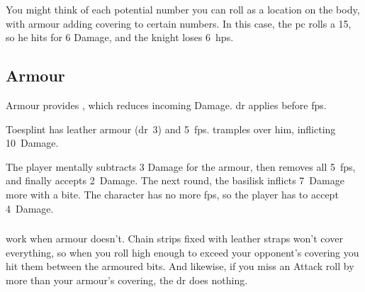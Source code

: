 \begin{multicols}{2}
{\begin{exampletext}
  You might think of each potential number you can roll as a location on the body, with armour adding \gls{covering} to certain numbers.
  In this case, the \gls{pc} rolls a 15, so he hits for 6 Damage, and the knight loses 6~\glspl{hp}.
  \end{exampletext}

}{

}

\subsection{Armour}

Armour provides , which reduces incoming Damage.
\Gls{dr} applies before \glspl{fp}.

\begin{exampletext}
  Toesplint has leather armour (\gls{dr}~3) and 5~\glspl{fp}.
   tramples over him, inflicting 10~Damage.

  The player mentally subtracts 3 Damage for the armour, then removes all 5~\glspl{fp}, and finally accepts 2~Damage.
  The next \gls{round}, the \gls{basilisk} inflicts 7~Damage more with a bite.
  The character has no more \glspl{fp}, so the player has to accept 4~Damage.
\end{exampletext}

\subsubsection{}
\label{vitals}
work when armour doesn't.
Chain strips fixed with leather straps won't cover everything, so when you roll high enough to exceed your opponent's \gls{covering} you hit them between the armoured bits.
And likewise, if you miss an Attack roll by more than your armour's \gls{covering}, the \gls{dr} does nothing.


\end{multicols}
